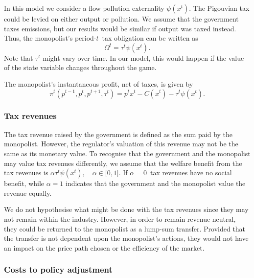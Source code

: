 \label{sec:tax-rule}

In this model we consider a flow pollution externality $\psi (x^{t})$. The
Pigouvian tax could be levied on either output or pollution. We assume that
the government taxes emissions, but our results would be similar if output
was taxed instead. Thus, the monopolist's period-$t$\ tax obligation can be
written as 
\begin{equation}
\Omega ^{t}=\tau ^{t}\psi (x^{t}).
\end{equation}%
Note that $\tau ^{t}$ might vary over time. In our model, this would happen
if the value of the state variable changes throughout the game.

The monopolist's instantaneous profit, net of taxes, is given by 
\begin{equation}
\pi ^{t}(p^{t-1},p^{t},p^{t+1},\tau ^{t})=p^{t}x^{t}-C(x^{t})-\tau ^{t}\psi
(x^{t}).
\end{equation}

\subsubsection{Tax revenues}

\label{sec:reven-from-taxat}

The tax revenue raised by the government is defined as the sum paid by the
monopolist. However, the regulator's valuation of this revenue may not be
the same as its monetary value. To recognise that the government and the
monopolist may value tax revenues differently, we assume that the welfare
benefit from the tax revenues is $\alpha \tau ^{t}\psi (x^{t}),\quad \alpha
\in \lbrack 0,1]$. If $\alpha =0$\ tax revenues have no social benefit,
while $\alpha =1$ indicates that the government and the monopolist value the
revenue equally.

We do not hypothesise what might be done with the tax revenues since they
may not remain within the industry. However, in order to remain
revenue-neutral, they could be returned to the monopolist as a lump-sum
transfer. Provided that the transfer is not dependent upon the monopolist's
actions, they would not have an impact on the price path chosen or the
efficiency of the market.

\subsubsection{Costs to policy adjustment}

\label{sec:costs-policy-adjustm}

